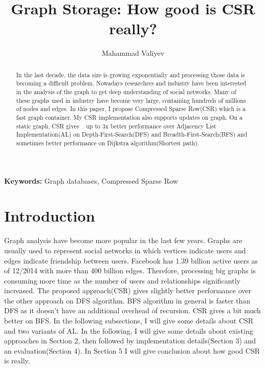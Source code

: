 \documentclass{article}
\title{Graph Storage: How good is CSR really?}
\author{Mahammad Valiyev}
\begin{document}
\maketitle

\begin{abstract}
  In the last decade, the data size is growing exponentially and processing those data is becoming a difficult problem. Nowadays researchers and industry have been interested in the analysis of the graph to get deep understanding of social networks. Many of these graphs used in industry have become very large, containing hundreds of millions of nodes and edges. In this paper, I propose Compressed Sparse Row(CSR) which is a fast graph container. My CSR implementation also supports updates on graph. On a static graph, CSR gives ~ up to 3x better performance over Adjacency List Implementation(AL) on Depth-First-Search(DFS) and Breadth-First-Search(BFS) and sometimes better performance on Dijkstra algorithm(Shortest path).
\end{abstract}
\textbf{Keywords:} Graph databases, Compressed Sparse Row

\section{Introduction}
Graph analysis have become more popular in the last few years. Graphs are usually used to represent social networks in which vertices indicate users and edges indicate friendship between users. Facebook has 1.39 billion  active users as of 12/2014 with more than 400 billion edges\cite{fb}. Therefore, processing big graphs is consuming more time as the number of users and relationships significantly increased. The proposed approach(CSR) gives slightly better performance over the other approach on DFS algorithm. BFS algorithm in general is faster than DFS as it doesn't have an additional overhead of recursion. CSR gives a bit much better on BFS. In the following subsections, I will give some details about CSR and two variants of AL. In the following, I will give some details about existing approaches in Section 2, then followed by implementation details(Section 3) and an evaluation(Section 4). In Section 5 I will give conclusion about how good CSR is really.
\end{document}
